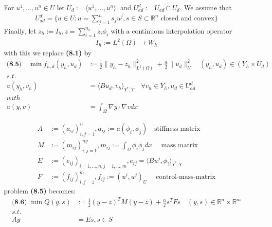 \documentclass[a4paper,11pt,fleqn]{book}
\theoremstyle{definition}
\theoremstyle{remark}
\begin{document}
For $u^1, \dots, u^n \in U$ let $U_d:= \langle u^1, \dots, u^n \rangle$. and $U_{ad}^d := U_{ad} \cap U_d$. We assume that
\begin{align*}
	U_{ad}^d = \{u \in U: u = \sum_{j = 1}^n s_j u^j, s \in S \subset \mathbb{R}^n \text{ closed and convex} \}
\end{align*} 
Finally, let $z_h:= I_h, z = \sum_{i = 1}^{n_h} z_i \phi_i$ with a continuous interpolation operator 
\begin{align*}
	I_h:= L^2(\Omega) \rightarrow W_h
\end{align*}
with this we replace \textbf{(8.1)} by 
\begin{align*}
\textbf{(8.5)} \quad
	\min f_{h,d} (y_h, u_d) &:= \frac{1}{2}\|y_h - z_h\|_{L^2(\Omega)}^2 + \frac{\alpha}{2}\|u_d\|^2_U \quad (y_h, u_d) \in (Y_h \times U_d)\\
	s.t.\\
	a(y_h, v_h) &= \langle Bu_d, v_h \rangle_{Y^*, Y} \quad \forall v_h \in Y_h, u_d \in U_{ad}^d\\
	with\\
	a(y, v) &= \int_\Omega \nabla y \cdot \nabla v dx
\end{align*}

\begin{align*}
	A&:= (a_{ij})_{i, j = 1}^n, a_{ij} := a(\phi_i, \phi_j) \quad \text{stiffness matrix}\\
	M&:= (m_{ij})_{i, j = 1}^{ng}, m_{ij} := \int_\Omega \phi_i \phi_j dx \quad \text{ mass matrix}\\
	E&:= (e_{ij})_{i = 1, \dots, n, j = 1, \dots, m}, e_{ij} = \langle Bu^j, \phi_i \rangle_{Y^*, Y}\\
	F&:= (f_{ij})_{i, j = 1}^m, f_{ij}:= (u^i, u^j)_U \quad \text{ control-mass-matrix}
\end{align*}
problem \textbf{(8.5)} becomes:
\begin{align*}
\textbf{(8.6) }
	\min Q(y, s)&:= \frac{1}{2}(y - z)^T M(y - z) + \frac{\alpha}{2} s^T F s  \quad (y, s) \in \mathbb{R}^n \times \mathbb{R}^m\\
	s.t.\\
	Ay &= Es, s \in S 
\end{align*}
\end{document}
